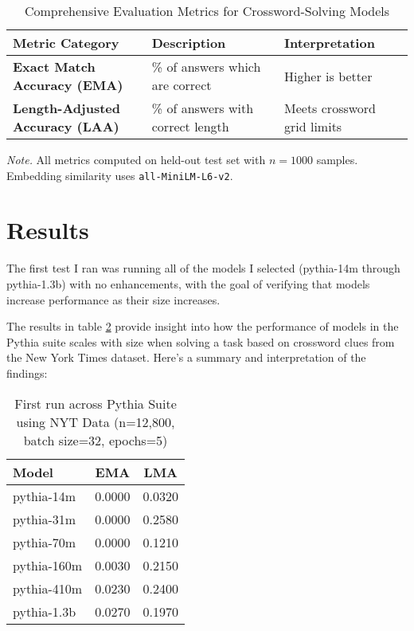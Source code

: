 \documentclass[
	a4paper, %
	10pt, %
	unnumberedsections, %
	twoside, %
]{LTJournalArticle}
\begin{document}
\begin{table}[t]
	\centering
	\caption{Comprehensive Evaluation Metrics for Crossword-Solving Models}
	\label{tab:evaluation_metrics}
	\begin{tabular}{l l l}
		\toprule
		\textbf{Metric Category} & \textbf{Description} & \textbf{Interpretation} \\
		\midrule
		\textbf{Exact Match Accuracy (EMA)} & \% of answers which are correct & 
		Higher is better \\
		\textbf{Length-Adjusted Accuracy (LAA)} & 
		\% of answers with correct length & 
		Meets crossword grid limits \\
		
	\end{tabular}
	\vspace{0.2cm}
	\footnotesize \textit{Note.} All metrics computed on held-out test set with $n=1000$ samples. Embedding similarity uses \texttt{all-MiniLM-L6-v2}.
\end{table}


\section{Results}

The first test I ran was running all of the models I selected (pythia-14m through pythia-1.3b) with no enhancements, with the goal of verifying that models increase performance as their size increases.

The results in table \ref{tab:pythiarun1} provide insight into how the performance of models in the Pythia suite scales with size when solving a task based on crossword clues from the New York Times dataset. Here's a summary and interpretation of the findings:

\begin{table}[h] %
	\centering
	\begin{tabular}{l c c}
		\toprule
		Model & EMA & LMA \\
		\midrule
		pythia-14m & 0.0000 & 0.0320 \\
		pythia-31m & 0.0000 & 0.2580 \\
		pythia-70m & 0.0000 & 0.1210 \\
		pythia-160m & 0.0030 & 0.2150 \\
		pythia-410m & 0.0230 & 0.2400 \\
		pythia-1.3b & 0.0270 & 0.1970 \\
		\bottomrule
	\end{tabular}
	\label{tab:pythiarun1}
	\caption{First run across Pythia Suite using NYT Data (n=12,800, batch size=32, epochs=5)}
\end{table}
\end{document}
